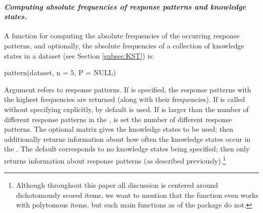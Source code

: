 \documentclass[nojss]{jss}
\begin{document}
\paragraph{\it Computing absolute frequencies of response patterns and knowledge states.}  
A function for computing the absolute frequencies of the occurring response patterns, 
and optionally, the absolute frequencies of a collection of knowledge states in a dataset 
(see Section \ref{subsec:KST}) is:
\begin{Code}
pattern(dataset, n = 5, P = NULL)
\end{Code}
Argument  refers to response patterns. If  is specified, the response patterns with the  highest 
frequencies are returned (along with their frequencies).  If  is called without specifying  explicitly, by default  is used. If  is larger than the number of different response patterns in the ,  is set the number of different response patterns.
The optional matrix  gives the knowledge states to be used;  then additionally returns information about 
how often the knowledge states occur in the .
The default  corresponds to no knowledge states being specified;
 then only returns information about response patterns 
(as described previously).\footnote{Although throughout this paper all discussion is centered 
around dichotomously scored items, we want to mention that the function 
even works with polytomous items, but such main functions as  of the package 
do not.} 
\end{document}
